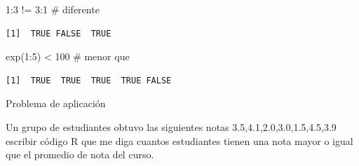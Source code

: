 \documentclass[
  ignorenonframetext,
  aspectratio=169,
  spanish,
]{beamer}
\newenvironment{Shaded}{\begin{snugshade}}{\end{snugshade}}
\newcommand{\CommentTok}[1]{\textcolor[rgb]{0.37,0.37,0.37}{#1}}
\newcommand{\DecValTok}[1]{\textcolor[rgb]{0.68,0.00,0.00}{#1}}
\newcommand{\FunctionTok}[1]{\textcolor[rgb]{0.28,0.35,0.67}{#1}}
\newcommand{\NormalTok}[1]{\textcolor[rgb]{0.00,0.23,0.31}{#1}}
\newcommand{\SpecialCharTok}[1]{\textcolor[rgb]{0.37,0.37,0.37}{#1}}
\begin{document}
\begin{frame}[fragile]{}
\label{section-3}
\begin{Shaded}
\begin{Highlighting}[]
\DecValTok{1}\SpecialCharTok{:}\DecValTok{3} \SpecialCharTok{!=} \DecValTok{3}\SpecialCharTok{:}\DecValTok{1} \CommentTok{\# diferente }
\end{Highlighting}
\end{Shaded}

\begin{verbatim}
[1]  TRUE FALSE  TRUE
\end{verbatim}
\end{frame}

\begin{frame}[fragile]{}
\label{section-4}
\begin{Shaded}
\begin{Highlighting}[]
\FunctionTok{exp}\NormalTok{(}\DecValTok{1}\SpecialCharTok{:}\DecValTok{5}\NormalTok{) }\SpecialCharTok{\textless{}} \DecValTok{100} \CommentTok{\# menor que }
\end{Highlighting}
\end{Shaded}

\begin{verbatim}
[1]  TRUE  TRUE  TRUE  TRUE FALSE
\end{verbatim}
\end{frame}

\begin{frame}{Problema de aplicación}
\label{problema-de-aplicaciuxf3n}
\begin{tcolorbox}[enhanced jigsaw, leftrule=.75mm, left=2mm, colback=white, toptitle=1mm, bottomrule=.15mm, arc=.35mm, breakable, title=\textcolor{quarto-callout-important-color}{\faExclamation}\hspace{0.5em}{Importante}, coltitle=black, colbacktitle=quarto-callout-important-color!10!white, bottomtitle=1mm, opacityback=0, rightrule=.15mm, toprule=.15mm, colframe=quarto-callout-important-color-frame, opacitybacktitle=0.6, titlerule=0mm]

Un grupo de estudiantes obtuvo las siguientes notas
3.5,4.1,2.0,3.0,1.5,4.5,3.9 escribir código R que me diga cuantos
estudiantes tienen una nota mayor o igual que el promedio de nota del
curso.

\end{tcolorbox}
\end{frame}
\end{document}
